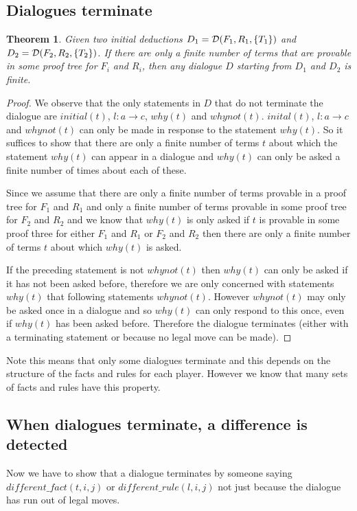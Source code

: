 \documentclass{blue-book}
\newtheorem{theorem}{Theorem}
\newcommand{\drule}[3]{\ensuremath{#1:#2 \rightarrow #3}}
\newcommand{\deduction}[3]{\ensuremath{{\cal D}(#1, #2, #3)}}
\begin{document}
\subsection{Dialogues terminate} 
\begin{theorem}Given two initial deductions $D_1 = \deduction{F_1}{R_1}{\{T_1\}}$ and $D_2 = \deduction{F_2}{R_2}{\{T_2\}}$.  If there are only a finite number of terms that are provable in some proof tree for $F_i$ and $R_i$, then  any dialogue $D$ starting from $D_1$ and $D_2$ is finite.
\end{theorem}
\begin{proof}
We observe that the only statements in $D$ that do not terminate the dialogue are $initial(t)$, $\drule{l}{a}{c}$, $why(t)$ and $whynot(t)$.  $inital(t)$, $\drule{l}{a}{c}$ and $whynot(t)$ can only be made in response to the statement $why(t)$.  So it suffices to show that there are only a finite number of terms $t$ about which the statement $why(t)$ can appear in a dialogue and $why(t)$ can only be asked a finite number of times about each of these.  

Since we assume that there are only a finite number of terms provable in a proof tree for $F_1$ and $R_1$ and only a finite number of terms provable in some proof tree for $F_2$ and $R_2$ and we know that $why(t)$ is only asked if $t$ is provable in some proof three for either  $F_1$ and $R_1$  or  $F_2$ and $R_2$ then there are only a finite number of terms $t$ about which $why(t)$ is asked.

If the preceding statement is not $whynot(t)$ then $why(t)$ can only be asked if it has not been asked before, therefore we are only concerned with statements $why(t)$ that following statements $whynot(t)$.  However $whynot(t)$ may only be asked once in a dialogue and so $why(t)$ can only respond to this once, even if $why(t)$ has been asked before.  Therefore the dialogue terminates (either with a terminating statement or because no legal move can be made).
\end{proof}

Note this means that only some dialogues terminate and this depends on the structure of the facts and rules for each player.  However we know that many sets of facts and rules have this property.  

\subsection{When dialogues terminate, a difference is detected} 
Now we have to show that a dialogue terminates by someone saying $\mathit{different\_fact}(t, i, j)$ or $\mathit{different\_rule}(l, i, j)$ not just because the dialogue has run out of legal moves. 
\end{document}
